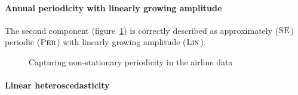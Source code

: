 \documentclass[letterpaper]{article}
\begin{document}

\paragraph{Annual periodicity with linearly growing amplitude}

The second component (figure~\ref{fig:lin_periodic}) is correctly described as approximately (${\textsc{SE}}$) periodic (${\textsc{Per}}$) with linearly growing amplitude (${\textsc{Lin}}$).

\begin{figure}[h]
\centering
{}
\caption{Capturing non-stationary periodicity in the airline data}
\label{fig:lin_periodic}
\end{figure}


\paragraph{Linear heteroscedasticity}
\end{document}
